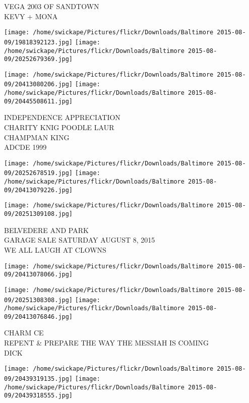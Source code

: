 \documentclass[10pt,letterpaper]{article}
\begin{document}
VEGA 2003 OF SANDTOWN\\
KEVY + MONA\\
\pagebreak

\texttt{[image: /home/swickape/Pictures/flickr/Downloads/Baltimore 2015-08-09/19818392123.jpg]}
\texttt{[image: /home/swickape/Pictures/flickr/Downloads/Baltimore 2015-08-09/20252679369.jpg]}

\texttt{[image: /home/swickape/Pictures/flickr/Downloads/Baltimore 2015-08-09/20413080206.jpg]}
\texttt{[image: /home/swickape/Pictures/flickr/Downloads/Baltimore 2015-08-09/20445508611.jpg]}

INDEPENDENCE APPRECIATION\\
CHARITY KNIG POODLE LAUR\\
CHAMPMAN KING\\
ADCDE 1999\\
\pagebreak

\texttt{[image: /home/swickape/Pictures/flickr/Downloads/Baltimore 2015-08-09/20252678519.jpg]}
\texttt{[image: /home/swickape/Pictures/flickr/Downloads/Baltimore 2015-08-09/20413079226.jpg]}

\vspace{0.25in}
\texttt{[image: /home/swickape/Pictures/flickr/Downloads/Baltimore 2015-08-09/20251309108.jpg]}

BELVEDERE AND PARK\\
GARAGE SALE SATURDAY AUGUST 8, 2015\\
WE ALL LAUGH AT CLOWNS\\
\pagebreak

\texttt{[image: /home/swickape/Pictures/flickr/Downloads/Baltimore 2015-08-09/20413078066.jpg]}

\vspace{0.25in}
\texttt{[image: /home/swickape/Pictures/flickr/Downloads/Baltimore 2015-08-09/20251308308.jpg]}
\texttt{[image: /home/swickape/Pictures/flickr/Downloads/Baltimore 2015-08-09/20413076846.jpg]}

CHARM CE\\
REPENT \& PREPARE THE WAY THE MESSIAH IS COMING\\
DICK\\
\pagebreak

\texttt{[image: /home/swickape/Pictures/flickr/Downloads/Baltimore 2015-08-09/20439319135.jpg]}
\texttt{[image: /home/swickape/Pictures/flickr/Downloads/Baltimore 2015-08-09/20439318555.jpg]}
\end{document}
